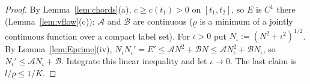\begin{proof}
By Lemma~\ref{lem:chords}(a), $c\ge c(t_1)>0$ on $[t_1,t_2]$, so $E$ is $C^1$ there (Lemma~\ref{lem:vflow}(c));
$\mathcal A$ and $\mathcal B$ are continuous ($\underline\rho$ is a minimum of a jointly continuous function over a
compact label set). For $\iota>0$ put $N_\iota:=(N^2+\iota^2)^{1/2}$. By Lemma~\ref{lem:Eprime}(iv),
$N_\iota N_\iota'=E'\le\mathcal AN^2+\mathcal BN\le\mathcal AN_\iota^2+\mathcal BN_\iota$, so
$N_\iota'\le\mathcal AN_\iota+\mathcal B$. Integrate this linear inequality and let $\iota\to0$. The last claim is
$l/\underline\rho\le1/K$.
\end{proof}

